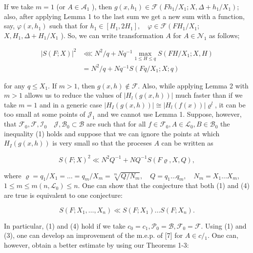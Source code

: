 \documentclass[10pt]{article}
\begin{document}
If we take $m=1$ (or $A \in \mathscr{A}_{1}$ ), then $g\left(x, h_{1}\right) \in \mathscr{F}\left(F h_{1} / X_{1} ; X, \Delta+h_{1} / X_{1}\right)$; also, after applying Lemma 1 to the last sum we get a new sum with a function, say, $\varphi\left(x, h_{1}\right)$ such that for $h_{1} \in\left[H_{1}, 2 H_{1}\right], \quad \varphi \in \mathscr{F}\left(F H_{1} / X_{1}\right.$; $X, H_{1}, \Delta+H_{1} / X_{1}$ ). So, we can write transformation $A$ for $A \in \mathscr{N}_{1}$ as follows;


\begin{align*}
|S(F ; X)|^{2} & \lll N^{2} / q+N q^{-1} \max _{1 \leqslant H \leqslant q} S\left(F H / X_{1} ; X, H\right)  \tag{3}\\
& =N^{2} / q+N q^{-1} S\left(F q / X_{1} ; X ; q\right)
\end{align*}


for any $q \leqslant X_{1}$. If $m>1$, then $g(x, h) \notin \mathscr{F}$. Also, while applying Lemma 2 with $m>1$ allows us to reduce the values of $\left|H_{l}(g(x, h))\right|$ much faster than if we take $m=1$ and in a generic case $\left|H_{I}(g(x, h))\right| \cong\left|H_{l}(f(x))\right| \varrho^{l}$, it can be too small at some points of $\mathscr{J}_{1}$ and we cannot use Lemma 1. Suppose, however, that $\mathscr{F}_{0}, \mathscr{F}, \mathscr{I}_{0} \quad \mathscr{J}, \mathscr{B}_{0} \subset \mathscr{B}$ are such that for all $f \in \mathscr{F}_{0}, A \in \mathscr{L}_{0}, B \in \mathscr{B}_{0}$ the inequality (1) holds and suppose that we can ignore the points at which $H_{I}(g(x, h))$ is very small so that the proceses $A$ can be written as


\begin{equation*}
S(F ; X)^{2} \ll N^{2} Q^{-1}+N Q^{-1} S(F \varrho, X, Q), \tag{4}
\end{equation*}


where $\varrho=q_{1} / X_{1}=\ldots=q_{m} / X_{m}=\sqrt[m]{Q / N_{m}}, \quad Q=q_{1} \ldots q_{m}, \quad N_{m}=X_{1} \ldots X_{m}$, $1 \leqslant m \leqslant m\left(n, \mathscr{L}_{0}\right) \leqslant n$. One can show that the conjecture that both (1) and (4) are true is equivalent to one conjecture:

$$
S\left(F ; X_{1}, \ldots, X_{n}\right) \ll S\left(F ; X_{1}\right) \ldots S\left(F ; X_{n}\right) .
$$

In particular, (1) and (4) hold if we take $c_{0}=c_{1}, \mathscr{P}_{0}=\mathscr{B}, \mathscr{F}_{0}=\mathscr{F}$. Using (1) and (3), one can develop an improvement of the m.e.p. of [7] for $A \in c /{ }_{1}$. One can, however, obtain a better estimate by using our Theorems 1-3:
\end{document}
